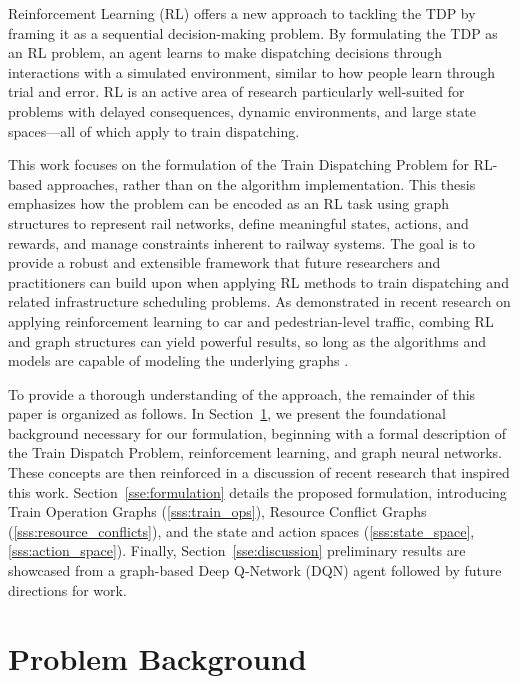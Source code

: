 \documentclass[runningheads]{llncs}
\begin{document}
Reinforcement Learning (RL) offers a new approach to tackling the TDP by framing it as a sequential decision-making problem.
By formulating the TDP as an RL problem, an agent learns to make dispatching decisions through interactions with a simulated environment, similar to how people learn through trial and error. 
RL is an active area of research particularly well-suited for problems with delayed consequences, dynamic environments, and large state spaces—all of which apply to train dispatching. 

This work focuses on the formulation of the Train Dispatching Problem for RL-based approaches, rather than on the algorithm implementation. 
This thesis emphasizes how the problem can be encoded as an RL task using graph structures to represent rail networks, define meaningful states, actions, and rewards, and manage constraints inherent to railway systems. 
The goal is to provide a robust and extensible framework that future researchers and practitioners can build upon when applying RL methods to train dispatching and related infrastructure scheduling problems.
As demonstrated in recent research on applying reinforcement learning to car and pedestrian-level traffic, combing RL and graph structures can yield powerful results, so long as the algorithms and models are capable of modeling the underlying graphs \cite{gnndrl:Devailly_2022}.

To provide a thorough understanding of the approach, the remainder of this paper is organized as follows. 
In Section~\ref{sse:background}, we present the foundational background necessary for our formulation, beginning with a formal description of the Train Dispatch Problem, reinforcement learning, and graph neural networks.
These concepts are then reinforced in a discussion of recent research that inspired this work.
Section~\ref{sse:formulation} details the proposed formulation, introducing Train Operation Graphs (\ref{sss:train_ops}), Resource Conflict Graphs (\ref{sss:resource_conflicts}), and the state and action spaces (\ref{sss:state_space}, \ref{sss:action_space}). 
Finally, Section~\ref{sse:discussion} preliminary results are showcased from a graph-based Deep Q-Network (DQN) agent followed by future directions for work.



\section{Problem Background}
\label{sse:background}
\end{document}
